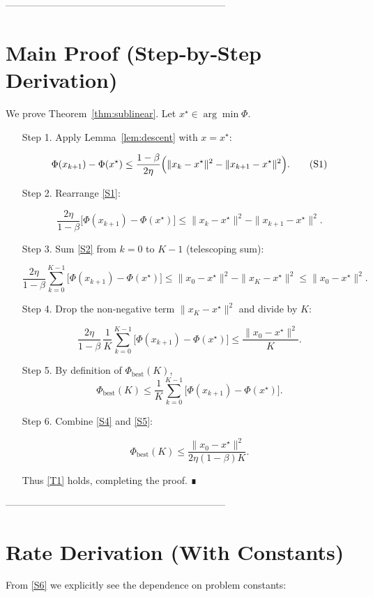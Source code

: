 \documentclass{article}
\begin{document}
--------------------------------------------------------------------

\section*{Main Proof (Step‑by‑Step Derivation)}
We prove Theorem~\ref{thm:sublinear}.  
Let $x^{\star}\in\arg\min\Phi$.

\begin{enumerate}
\item[Step 1.] Apply Lemma~\ref{lem:descent} with $x=x^{\star}$:

\[
\Phi(x_{k+1})-\Phi(x^{\star})
\le \frac{1-\beta}{2\eta}\Bigl(\|x_{k}-x^{\star}\|^{2}-\|x_{k+1}-x^{\star}\|^{2}\Bigr).
\tag{S1}
\]

\item[Step 2.] Rearrange \eqref{S1}:

\[
\frac{2\eta}{1-\beta}\bigl[\Phi(x_{k+1})-\Phi(x^{\star})\bigr]
\le \|x_{k}-x^{\star}\|^{2}-\|x_{k+1}-x^{\star}\|^{2}.
\tag{S2}
\]

\item[Step 3.] Sum \eqref{S2} from $k=0$ to $K-1$ (telescoping sum):

\[
\frac{2\eta}{1-\beta}\sum_{k=0}^{K-1}\bigl[\Phi(x_{k+1})-\Phi(x^{\star})\bigr]
\le \|x_{0}-x^{\star}\|^{2}-\|x_{K}-x^{\star}\|^{2}
\le \|x_{0}-x^{\star}\|^{2}.
\tag{S3}
\]

\item[Step 4.] Drop the non‑negative term $\|x_{K}-x^{\star}\|^{2}$ and divide by $K$:

\[
\frac{2\eta}{1-\beta}\,\frac{1}{K}\sum_{k=0}^{K-1}\bigl[\Phi(x_{k+1})-\Phi(x^{\star})\bigr]
\le \frac{\|x_{0}-x^{\star}\|^{2}}{K}.
\tag{S4}
\]

\item[Step 5.] By definition of $\Phi_{\text{best}}(K)$,
\[
\Phi_{\text{best}}(K)\le \frac{1}{K}\sum_{k=0}^{K-1}\bigl[\Phi(x_{k+1})-\Phi(x^{\star})\bigr].
\tag{S5}
\]

\item[Step 6.] Combine \eqref{S4} and \eqref{S5}:

\[
\Phi_{\text{best}}(K)\le \frac{\|x_{0}-x^{\star}\|^{2}}{2\eta(1-\beta)K}.
\tag{S6}
\]

Thus \eqref{T1} holds, completing the proof. ∎
\end{enumerate}

--------------------------------------------------------------------

\section*{Rate Derivation (With Constants)}
From \eqref{S6} we explicitly see the dependence on problem constants:
\end{document}
